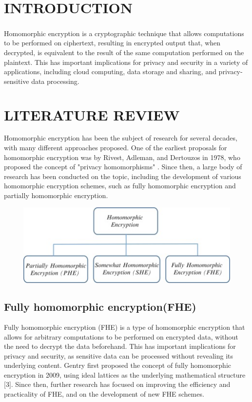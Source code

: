 \documentclass[a4paper,11pt]{report}
\begin{document}
  \tableofcontents
\thispagestyle{empty}

\chapter{INTRODUCTION}

\paragraph{}Homomorphic encryption is a cryptographic technique that allows computations to be performed on ciphertext, resulting in encrypted output that, when decrypted, is equivalent to the result of the same computation performed on the plaintext. This has important implications for privacy and security in a variety of applications, including cloud computing, data storage and sharing, and privacy-sensitive data processing.
  
\chapter{LITERATURE REVIEW}
Homomorphic encryption has been the subject of research for several decades, with many different approaches proposed. One of the earliest proposals for homomorphic encryption was by Rivest, Adleman, and Dertouzos in 1978, who proposed the concept of "privacy homomorphisms" . Since then, a large body of research has been conducted on the topic, including the development of various homomorphic encryption schemes, such as fully homomorphic encryption and partially homomorphic encryption.
\begin{figure}[h]
	\centering
	\hspace{21pt}
	\includegraphics[width=.70\linewidth]{type.jpg}
	\label{fig:type.png}
\end{figure}
\section{Fully homomorphic encryption(FHE)}
Fully homomorphic encryption (FHE) is a type of homomorphic encryption that allows for arbitrary computations to be performed on encrypted data, without the need to decrypt the data beforehand. This has important implications for privacy and security, as sensitive data can be processed without revealing its underlying content. Gentry first proposed the concept of fully homomorphic encryption in 2009, using ideal lattices as the underlying mathematical structure [3]. Since then, further research has focused on improving the efficiency and practicality of FHE, and on the development of new FHE schemes.
\end{document}
